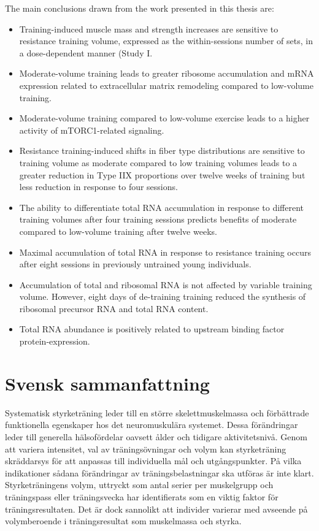 \documentclass[twoside,10pt]{gihclass} %
\begin{document}
The main conclusions drawn from the work presented in this thesis are:
\begin{itemize}
  \item Training-induced muscle mass and strength increases are sensitive to resistance training volume, expressed as the within-sessions number of sets, in a dose-dependent manner (Study I.
  \item Moderate-volume training leads to greater ribosome accumulation and mRNA expression related to extracellular matrix remodeling compared to low-volume training.
  \item Moderate-volume training compared to low-volume exercise leads to a higher activity of mTORC1-related signaling.
  \item Resistance training-induced shifts in fiber type distributions are sensitive to training volume as moderate compared to low training volumes leads to a greater reduction in Type IIX proportions over twelve weeks of training but less reduction in response to four sessions.
  \item The ability to differentiate total RNA accumulation in response to different training volumes after four training sessions predicts benefits of moderate compared to low-volume training after twelve weeks.
  \item Maximal accumulation of total RNA in response to resistance training occurs after eight sessions in previously untrained young individuals.
  \item Accumulation of total and ribosomal RNA is not affected by variable training volume. However, eight days of de-training training reduced the synthesis of ribosomal precursor RNA and total RNA content.
  \item Total RNA abundance is positively related to upstream binding factor protein-expression.
\end{itemize}
\hypertarget{svensk-sammanfattning}{%
\chapter{Svensk sammanfattning}\label{svensk-sammanfattning}}

Systematisk styrketräning leder till en större skelettmuskelmassa och förbättrade funktionella egenskaper hos det neuromuskulära systemet. Dessa förändringar leder till generella hälsofördelar oavsett ålder och tidigare aktivitetsnivå. Genom att variera intensitet, val av träningsövningar och volym kan styrketräning skräddarsys för att anpassas till individuella mål och utgångspunkter. På vilka indikationer sådana förändringar av träningsbelastningar ska utföras är inte klart. Styrketräningens volym, uttryckt som antal serier per muskelgrupp och träningspass eller träningsvecka har identifierats som en viktig faktor för träningsresultaten. Det är dock sannolikt att individer varierar med avseende på volymberoende i träningsresultat som muskelmassa och styrka.
\end{document}
